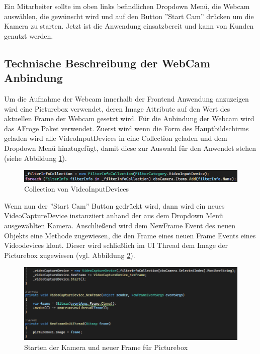 Ein Mitarbeiter sollte im oben links befindlichen Dropdown Menü, die Webcam auswählen, die gewünscht wird und auf den Button ''Start Cam'' drücken um die Kamera zu starten. Jetzt ist die Anwendung einsatzbereit und kann von Kunden genutzt werden.
\newpage
\subsection{Technische Beschreibung der WebCam Anbindung}
Um die Aufnahme der Webcam innerhalb der Frontend Anwendung anzuzeigen wird eine Picturebox verwendet, deren Image Attribute auf den Wert des aktuellen Frame der Webcam gesetzt wird. 
Für die Anbindung der Webcam wird das AFroge Paket verwendet. Zuerst wird wenn die Form des Hauptbildschirms geladen wird alle VideoInputDevices in eine Collection geladen und dem Dropdown Menü hinztugefügt, damit diese zur Auswahl für den Anwendet stehen (siehe Abbildung \ref{fig:projektmessewebcam1}).

\begin{figure}[h]
	\centering
	\includegraphics[width=0.9\linewidth]{Images/Projekt_Messe_Webcam1}
	\caption{Collection von VideoInputDevices}
	\label{fig:projektmessewebcam1}
\end{figure}

Wenn nun der ''Start Cam'' Button gedrückt wird, dann wird ein neues VideoCaptureDevice instanziiert anhand der aus dem Dropdown Menü ausgewählten Kamera. Anschließend wird dem NewFrame Event des neuen Objekts eine Methode zugewiesen, die den Frame eines neuen Frame Events eines Videodevices klont. Dieser wird schließlich im UI Thread dem Image der Picturebox zugewiesen (vgl. Abbildung \ref{fig:projektmessewebcam2}).

\begin{figure}[h]
	\centering
	\includegraphics[width=0.9\linewidth]{Images/Projekt_Messe_Webcam2}
	\caption{Starten der Kamera und neuer Frame für Picturebox}
	\label{fig:projektmessewebcam2}
\end{figure}

